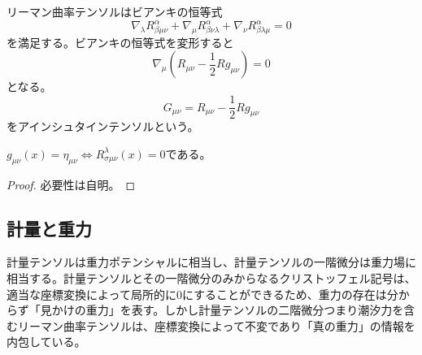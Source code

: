     リーマン曲率テンソルはビアンキの恒等式
        \[\nabla_\lambda R^\alpha_{\beta \mu\nu} + \nabla_\mu R^\alpha_{\beta \nu\lambda} + \nabla_\nu R^\alpha_{\beta \lambda\mu} = 0\]
    を満足する。ビアンキの恒等式を変形すると
        \[\nabla_\mu \left(R_{\mu\nu} - \frac{1}{2}Rg_{\mu\nu}\right) = 0\]
    となる。
        \[G_{\mu\nu} = R_{\mu\nu} - \frac{1}{2}Rg_{\mu\nu}\]
    をアインシュタインテンソルという。

    \begin{thm}
        $g_{\mu\nu}(x) = \eta_{\mu\nu} \iff R^\lambda_{\sigma\mu\nu}(x) = 0$である。
    \end{thm}
    \begin{proof}
        必要性は自明。
    \end{proof}

\subsection{計量と重力}
    計量テンソルは重力ポテンシャルに相当し、計量テンソルの一階微分は重力場に相当する。計量テンソルとその一階微分のみからなるクリストッフェル記号は、適当な座標変換によって局所的に0にすることができるため、重力の存在は分からず「見かけの重力」を表す。しかし計量テンソルの二階微分つまり潮汐力を含むリーマン曲率テンソルは、座標変換によって不変であり「真の重力」の情報を内包している。